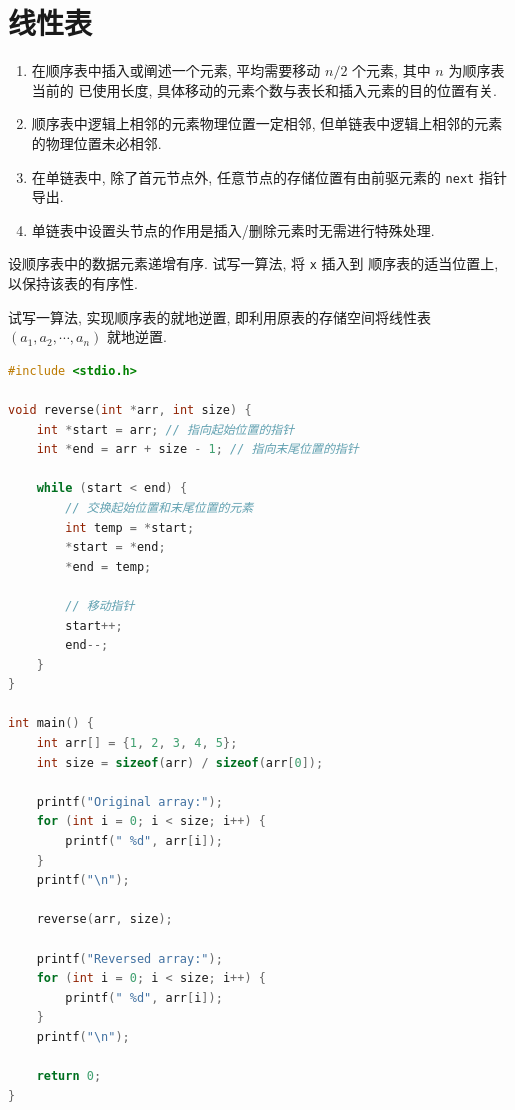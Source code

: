 \documentclass[10pt,UTF8]{book} %
\begin{document}
\mainmatter

\setcounter{chapter}{1}
\chapter{线性表}

\begin{exercise}
    \begin{enumerate}[itemsep=0pt, label={$\left.\arabic*\right)$}]
        \item 在顺序表中插入或阐述一个元素, 平均需要移动 $n/2$ 个元素, 其中 $n$ 为顺序表当前的
        已使用长度, 具体移动的元素个数与表长和插入元素的目的位置有关.
        \item 顺序表中逻辑上相邻的元素物理位置一定相邻, 但单链表中逻辑上相邻的元素的物理位置未必相邻.
        \item 在单链表中, 除了首元节点外, 任意节点的存储位置有由前驱元素的 \lstinline|next| 指针导出.
        \item 单链表中设置头节点的作用是插入/删除元素时无需进行特殊处理.
    \end{enumerate}
\end{exercise}

\begin{exercise}
    设顺序表中的数据元素递增有序. 试写一算法, 将 \lstinline|x| 插入到
    顺序表的适当位置上, 以保持该表的有序性.
    
\end{exercise}

\begin{exercise}
    试写一算法, 实现顺序表的就地逆置, 即利用原表的存储空间将线性表 $(a_1, a_2, \cdots, a_n)$
    就地逆置.
    \begin{lstlisting}[language=C]
#include <stdio.h>

void reverse(int *arr, int size) {
    int *start = arr; // 指向起始位置的指针
    int *end = arr + size - 1; // 指向末尾位置的指针

    while (start < end) {
        // 交换起始位置和末尾位置的元素
        int temp = *start;
        *start = *end;
        *end = temp;

        // 移动指针
        start++;
        end--;
    }
}

int main() {
    int arr[] = {1, 2, 3, 4, 5};
    int size = sizeof(arr) / sizeof(arr[0]);

    printf("Original array:");
    for (int i = 0; i < size; i++) {
        printf(" %d", arr[i]);
    }
    printf("\n");

    reverse(arr, size);

    printf("Reversed array:");
    for (int i = 0; i < size; i++) {
        printf(" %d", arr[i]);
    }
    printf("\n");

    return 0;
}

    \end{lstlisting}
\end{exercise}
\end{document}
